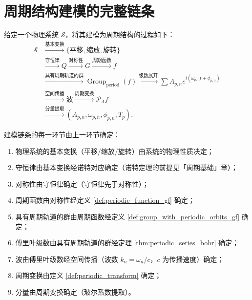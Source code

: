 \section{周期结构建模的完整链条}

\begin{definition}[周期结构建模的完整链条]
\label{def:modelling_chain}
给定一个物理系统 $\mathcal{S}$，将其建模为周期结构的过程如下：
\[
\begin{aligned}
\mathcal{S}
&\xrightarrow{\text{基本变换}}
\{\text{平移}, \text{缩放}, \text{旋转}\} \\
&\xrightarrow{\text{守恒律}} Q
\xrightarrow{\text{对称性}} G
\xrightarrow{\text{周期函数}} f \\
&\xrightarrow{\text{具有周期轨道的群}} \operatorname{Group}_{\mathrm{period}}(f)
\xrightarrow{\text{级数展开}} \sum A_{p,n} e^{i(\omega_{p,n} t + \phi_{p,n})} \\
&\xrightarrow{\text{空间传播}} \text{波}
\xrightarrow{\text{周期变换}} \mathcal{P}_\Lambda f \\
&\xrightarrow{\text{分量提取}} (A_{p,n}, \omega_{p,n}, \phi_{p,n}, T_p).
\end{aligned}
\]
\end{definition}

\begin{remark}[建模链条的一致性]\label{rem:modelling_chain_consistency}
建模链条的每一环节由上一环节确定：
\begin{enumerate}[label=(\roman*)]
    \item 物理系统的基本变换（平移/缩放/旋转）由系统的物理性质决定；
    \item 守恒律由基本变换经诺特对应确定（诺特定理的前提见「周期基础」章）；
    \item 对称性由守恒律确定（守恒律先于对称性）；
    \item 周期函数由对称性经定义 \ref{def:periodic_function_gf} 确定；
    \item 具有周期轨道的群由周期函数经定义 \ref{def:group_with_periodic_orbits_gf} 确定；
    \item 傅里叶级数由具有周期轨道的群经定理 \ref{thm:periodic_series_bohr} 确定；
    \item 波由傅里叶级数经空间传播（波数 $k_n = \omega_n / c$，$c$ 为传播速度）确定；
    \item 周期变换由定义 \ref{def:periodic_transform} 确定；
    \item 分量由周期变换确定（玻尔系数提取）。
\end{enumerate}
\end{remark}

